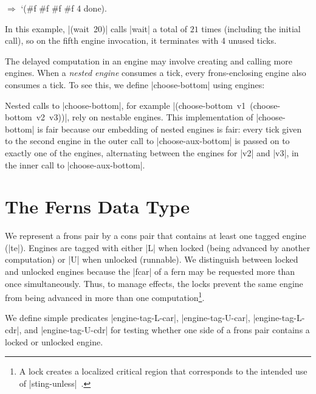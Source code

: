 \nspace
\begin{schemeresponse}
$\Rightarrow$ `(#f #f #f #f 4 done).
\end{schemeresponse}

\wspace

\noindent In this example, \mbox{\scheme|(wait 20)|} calls
\scheme|wait| a total of $21$ times (including the initial call), so
on the fifth engine invocation, it terminates with 4 unused ticks.

The delayed computation in an engine may involve creating and calling
more engines. When a \emph{nested engine}
\cite{hieb94subcontinuations} consumes a tick, every
frons-enclosing engine also consumes a tick. To see this, we define
\scheme|choose-bottom| using engines:

\schemedisplayspace
{}

\wspace

\noindent Nested calls to \scheme|choose-bottom|, for example 
\mbox{\scheme|(choose-bottom v1 (choose-bottom v2 v3))|}, rely on nestable engines.  
This implementation of \scheme|choose-bottom| is fair because our embedding
of nested engines is fair: every tick given to the second engine in
the outer call to \scheme|choose-aux-bottom| is passed on to exactly one of
the engines, alternating between the engines for \scheme|v2| and
\scheme|v3|, in the inner call to \scheme|choose-aux-bottom|.

\section{The Ferns Data Type}\label{fernsdatatype}

We represent a frons pair by a cons pair that contains at least one
tagged engine (\scheme|te|). Engines are tagged with either \scheme|L|
when locked (being advanced by another computation) or \scheme|U| when
unlocked (runnable).  We distinguish between locked and unlocked
engines because the \scheme|fcar| of a fern may be requested more than
once simultaneously. Thus, to manage effects, the locks prevent the same
engine from being advanced in more than one computation\footnote{A lock creates a localized critical region
that corresponds to the intended use of \scheme|sting-unless|~\cite{FriedmanWise78}.}.

We define simple predicates \scheme|engine-tag-L-car|,
\scheme|engine-tag-U-car|, \scheme|engine-tag-L-cdr|, and
\scheme|engine-tag-U-cdr| for testing whether one side of a frons pair
contains a locked or unlocked engine. 

